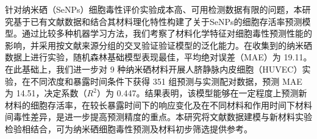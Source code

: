 针对纳米硒（SeNPs）细胞毒性评价实验成本高、可用检测数据有限的问题，本研究基于已有文献数据和结合其材料理化特性构建了关于SeNPs的细胞存活率预测模型。通过比较多种机器学习方法，我们考察了材料化学特征对细胞毒性预测性能的影响，并采用按文献来源分组的交叉验证验证模型的泛化能力。在收集到的纳米硒数据上进行实验，随机森林基础模型表现最佳，平均绝对误差（MAE）为 19.11。在此基础上，我们进一步对 9 种纳米硒材料开展人脐静脉内皮细胞（HUVEC）实验，在不同浓度和暴露时间条件下获得 351 组预测与实测配对数据，预测 MAE 为 14.51，决定系数（$R^2$）为 0.447。结果表明，该模型能够在一定程度上预测新材料的细胞存活率，在较长暴露时间下的响应变化及在不同材料和作用时间下材料间毒性差异，是进一步提高预测精度的重点。本研究将文献数据建模与新材料实验检验相结合，可为纳米硒细胞毒性预测及材料初步筛选提供参考。
